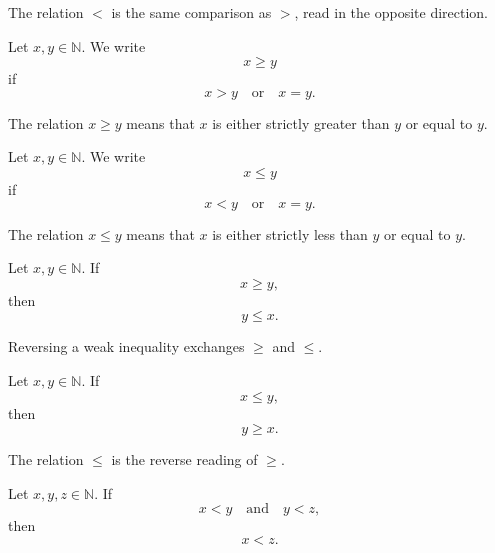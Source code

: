 \begin{remark*}[Interpretation]
The relation \(<\) is the same comparison as \(>\), read in the opposite direction.
\end{remark*}

\begin{definition}
\label{def:greater-than-or-equal-to}
Let \(x,y \in \mathbb{N}\). We write
\[
x \ge y
\]
if
\[
x > y
\quad \text{or} \quad
x = y.
\]
\end{definition}

\begin{remark*}[Interpretation]
The relation \(x \ge y\) means that \(x\) is either strictly greater than \(y\) or equal to \(y\).
\end{remark*}

\begin{definition}
\label{def:less-than-or-equal-to}
Let \(x,y \in \mathbb{N}\). We write
\[
x \le y
\]
if
\[
x < y
\quad \text{or} \quad
x = y.
\]
\end{definition}

\begin{remark*}[Interpretation]
The relation \(x \le y\) means that \(x\) is either strictly less than \(y\) or equal to \(y\).
\end{remark*}

\begin{theorem}
\label{thm:symmetry-of-greater-than-or-equal-to}
Let \(x,y \in \mathbb{N}\). If
\[
x \ge y,
\]
then
\[
y \le x.
\]
\end{theorem}

\begin{remark*}[Interpretation]
Reversing a weak inequality exchanges \(\ge\) and \(\le\).
\end{remark*}

\begin{theorem}
\label{thm:symmetry-of-less-than-or-equal-to}
Let \(x,y \in \mathbb{N}\). If
\[
x \le y,
\]
then
\[
y \ge x.
\]
\end{theorem}

\begin{remark*}[Interpretation]
The relation \(\le\) is the reverse reading of \(\ge\).
\end{remark*}

\begin{theorem}
\label{thm:transitivity-of-strict-ordering}
Let \(x,y,z \in \mathbb{N}\). If
\[
x < y
\quad \text{and} \quad
y < z,
\]
then
\[
x < z.
\]
\end{theorem}

